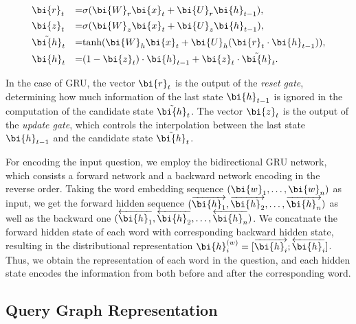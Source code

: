\begin{equation}
  \label{eqn:gru}
  \begin{aligned}
    & \bi{r}_t & = & \sigma(\bi{W}_r\bi{x}_t+\bi{U}_r\bi{h}_{t-1}), \\
    & \bi{z}_t & = & \sigma(\bi{W}_z\bi{x}_t+\bi{U}_z\bi{h}_{t-1}), \\
    & \tilde{\bi{h}}_t & = &\mbox{tanh}(\bi{W}_h\bi{x}_t+\bi{U}_h(\bi{r}_t\cdot\bi{h}_{t-1})), \\
    & \bi{h}_t & = & (1-\bi{z}_t)\cdot\bi{h}_{t-1}+\bi{z}_t\cdot\tilde{\bi{h}}_t. \\
  \end{aligned}
\end{equation}

\noindent
In the case of GRU, the vector $\bi{r}_t$ is the output of the \textit{reset gate},
determining how much information of the last state $\bi{h}_{t-1}$ is ignored
in the computation of the candidate state $\tilde{\bi{h}}_t$.
The vector $\bi{z}_t$ is the output of the \textit{update gate}, which controls the interpolation 
between the last state $\bi{h}_{t-1}$ and the candidate state $\tilde{\bi{h}}_t$.

For encoding the input question, we employ the bidirectional GRU network, which consists a
forward network and a backward network encoding in the reverse order.
Taking the word embedding sequence $(\bi{w}_1, \dots, \bi{w}_n)$ as input,
we get the forward hidden sequence
$(\overrightarrow{\bi{h}_1}, \overrightarrow{\bi{h}_2}, \dots, \overrightarrow{\bi{h}_n})$ 
as well as the backward one
$(\overleftarrow{\bi{h}_1}, \overleftarrow{\bi{h}_2}, \dots, \overleftarrow{\bi{h}_n})$.
We concatnate the forward hidden state of each word with corresponding backward hidden state,
resulting in the distributional representation $\bi{h}^{(w)}_i = [\overrightarrow{\bi{h}_i};\overleftarrow{\bi{h}_i}]$.
Thus, we obtain the representation of each word in the question, and each hidden state
encodes the information from both before and after the corresponding word.




\subsection{Query Graph Representation}
\label{sec:schema-encoding}

